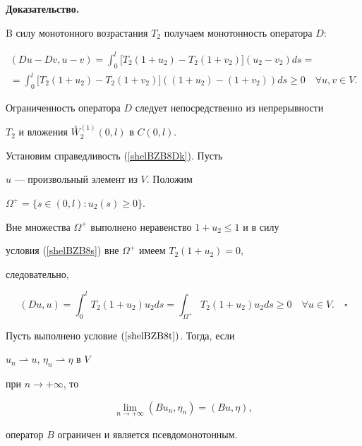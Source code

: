{\bf Доказательство.}


B силу монотонного возрастания $T_2$ получаем монотонность оператора $D$:


\begin{gather*}


(Du-Dv,u-v)=\int_{0}^{l}


\big[ T_{2}(1+u_2)-T_{2}(1+ v_2)\big](u_2-v_2) ds =\\


%


= \int_{0}^{l}\big[ T_{2}(1+u_2)-T_{2}(1+ v_2)\big] 


((1+u_2)-(1+v_2) ) ds\geq 0


\quad \forall u, v \in V.


\end{gather*}





Ограниченность оператора $D$ следует непосредственно из непрерывности


$T_2$ и вложения $\overset{\circ}{W}{}^{(1)}_2 (0, l)$ в $C(0,l)$.





Установим справедливость (\ref{shelBZB8Dk}). Пусть


$u$ --- произвольный элемент из $V$. Положим


$\Omega^+=\{s \in (0, l): u_2(s) \geq 0 \}$.


Вне множества $\Omega^+$ выполнено неравенство $1+u_2 \leq 1$ и в силу


условия (\ref{shelBZB8s}) вне $\Omega^+$ имеем $T_2(1+u_2)=0$,


следовательно,


$$


(Du,u)=\int_{0}^{l}T_{2}(1+u_2) u_2 ds =


\int_{\Omega^+}T_{2}(1+u_2) u_2 ds \geq 0


\quad \forall u \in V.\quad\square


$$








\begin{lem} \label{BZ_Izv05_L3}


Пусть выполнено условие $(\ref{shelBZB8t})$. Тогда, если


$u_n \rightharpoonup{u}$, $\eta_n \rightharpoonup \eta$ в $V$


при $n \to+\infty$, то


\begin{equation}


\lim_{n \to+\infty} (Bu_n,\eta_n)=(Bu,\eta),


\label{BZ_Izv05_L3_B_PsMon}


\end{equation}


оператор $B$ ограничен и является псевдомонотонным.


\end{lem}





